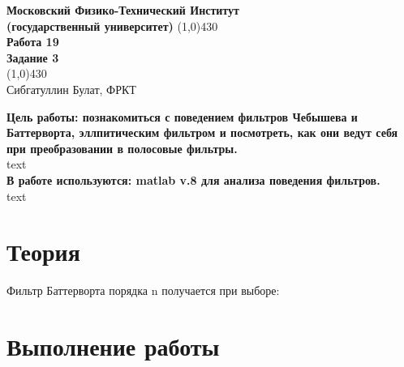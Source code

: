 \documentclass[a4paper, 12pt]{article}%
\begin{document}
\begin{titlepage}

\begin{center}
\large\textbf{Московский Физико-Технический Институт}\\
\large\textbf{(государственный университет)}
\vfill
\line(1,0){430}\\[1mm]
\huge\textbf{Работа 19}\\
\huge\textbf{Задание 3}\\
\line(1,0){430}\\[1mm]
\vfill
\large Сибгатуллин Булат, ФРКТ\\
\end{center}

\end{titlepage}
\noindent \textbf{Цель работы: познакомиться с поведением фильтров Чебышева и Баттерворта, эллпитическим фильтром и посмотреть, как они ведут себя при преобразовании в полосовые фильтры.} \\
\indent text\\
\noindent \textbf{В работе используются: matlab v.8 для анализа поведения фильтров.} \\
\indent text

\section*{Теория}

Фильтр Баттерворта порядка n получается при выборе:


\section*{Выполнение работы}
\end{document}
